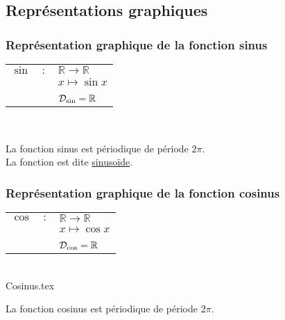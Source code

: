 \samepage

\newpage 

\renewcommand{\arraystretch }{1}

\subsection{Représentations graphiques}

\subsubsection{Représentation graphique de la fonction sinus}

\begin{tabular}{rl}
$\sin\quad : $ & $\mathbb{R} \longrightarrow \mathbb{R} $ \\
               &  $x \longmapsto \sin x $ \\
               & \\
               & $ {\Large \mathcal{D}_{\sin}} = \mathbb{R} $ \\
\end{tabular}\\



\bigskip 

La fonction sinus est périodique de période $2\pi$. \\

La fonction est dite \underline{sinusoïde}. 


\bigskip 

\subsubsection{Représentation graphique de la fonction cosinus}

\begin{tabular}{rl}
$\cos\quad : $ & $\mathbb{R} \longrightarrow \mathbb{R} $ \\
               &  $x \longmapsto \cos x $ \\
               & \\
               & $ {\Large \mathcal{D}_{\cos}} = \mathbb{R} $ \\
\end{tabular}\\

 {Cosinus.tex}

\bigskip 

La fonction cosinus est périodique de période $2\pi$. \\

